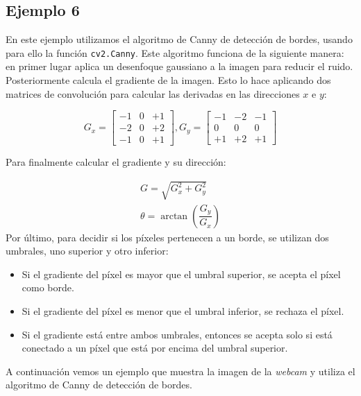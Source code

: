 \documentclass[a4paper,openright, 12pt]{book}
\begin{document}
\subsection*{Ejemplo 6}
En este ejemplo utilizamos el algoritmo de Canny \cite{canny86} de detección de bordes, usando para ello la función \lstinline|cv2.Canny|.
 Este algoritmo funciona de la siguiente manera: en primer lugar aplica un desenfoque gaussiano a la imagen para reducir el ruido. Posteriormente calcula el gradiente de la imagen. Esto lo hace aplicando dos matrices de convolución para calcular las derivadas en las direcciones $x$ e $y$:

\begin{equation*}
G_{x} = \begin{bmatrix} -1 & 0 & +1 \\ -2 & 0 & +2 \\ -1 & 0 & +1 \end{bmatrix},  G_{y} = \begin{bmatrix} -1 & -2 & -1 \\ 0 & 0 & 0 \\ +1 & +2 & +1 \end{bmatrix}
\end{equation*}

Para finalmente calcular el gradiente y su dirección:

\begin{equation*}
\begin{array}{l} G = \sqrt{ G_{x}^{2} + G_{y}^{2} } \\ \theta = \arctan(\dfrac{ G_{y} }{ G_{x} }) \end{array}
\end{equation*}
Por último, para decidir si los píxeles pertenecen a un borde, se utilizan dos umbrales, uno superior y otro inferior:
\begin{itemize}
\item Si el gradiente del píxel es mayor que el umbral superior, se acepta el píxel como borde.
\item Si el gradiente del píxel es menor que el umbral inferior, se rechaza el píxel.
\item Si el gradiente está entre ambos umbrales, entonces se acepta solo si está conectado a un píxel que está por encima del umbral superior.
\end{itemize}

A continuación vemos un ejemplo que muestra la imagen de la \textit{webcam} y utiliza el algoritmo de Canny de detección de bordes.
\end{document}
